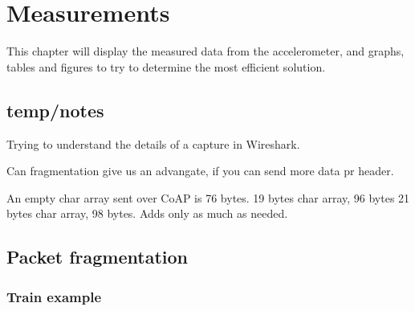 \chapter{Measurements}
\label{chp:measurements2}

This chapter will display the measured data from the accelerometer, and graphs, tables and figures to try to determine the most efficient solution. 

\section{temp/notes}

Trying to understand the details of a capture in Wireshark. 

Can fragmentation give us an advangate, if you can send more data pr header. 

An empty char array sent over CoAP is 76 bytes. 
19 bytes char array, 96 bytes
21 bytes char array, 98 bytes. Adds only as much as needed. 
 

\section{Packet fragmentation}



\subsection{Train example}





